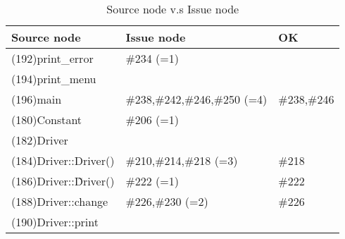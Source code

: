 \begin{table}[hb]
\begin{center}
\begin{tabular}{|l|l|l|}
\hline
Source node & Issue node & OK \\
\hline
(192)print\_error & \#234 (=1)& \\
(194)print\_menu & & \\
(196)main & \#238,\#242,\#246,\#250 (=4)& \#238,\#246\\
(180)Constant & \#206 (=1)& \\
(182)Driver & & \\
(184)Driver::Driver() & \#210,\#214,\#218 (=3)& \#218\\
(186)Driver::\~Driver() & \#222 (=1)& \#222\\
(188)Driver::change & \#226,\#230 (=2)& \#226\\
(190)Driver::print & & \\
\hline
\end{tabular}
\caption{Source node v.s Issue node}
\end{center}
\end{table}

